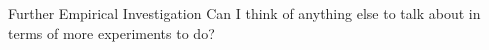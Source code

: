


\begin{anfxerror}{Further Empirical Investigation}
Can I think of anything else to talk about in terms of more experiments to do?
\end{anfxerror}
